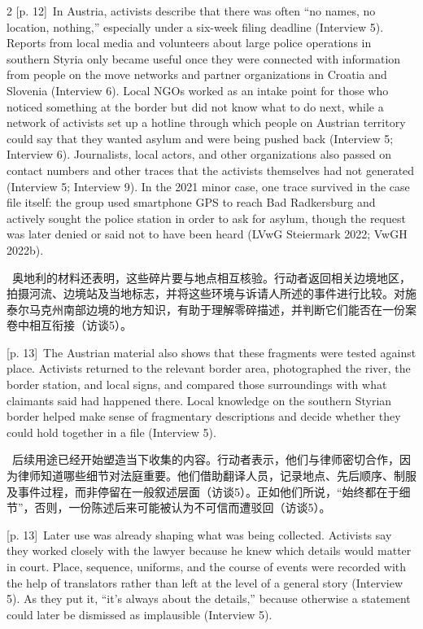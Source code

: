 \documentclass[10pt,a4paper]{article}
\begin{document}
\begin{paracol}{2}
{\scriptsize\color{gray} [p. 12]}\ In Austria, activists describe that there was often “no names, no location, nothing,” especially under a six-week filing deadline (Interview 5). Reports from local media and volunteers about large police operations in southern Styria only became useful once they were connected with information from people on the move networks and partner organizations in Croatia and Slovenia (Interview 6). Local NGOs worked as an intake point for those who noticed something at the border but did not know what to do next, while a network of activists set up a hotline through which people on Austrian territory could say that they wanted asylum and were being pushed back (Interview 5; Interview 6). Journalists, local actors, and other organizations also passed on contact numbers and other traces that the activists themselves had not generated (Interview 5; Interview 9). In the 2021 minor case, one trace survived in the case file itself: the group used smartphone GPS to reach Bad Radkersburg and actively sought the police station in order to ask for asylum, though the request was later denied or said not to have been heard (LVwG Steiermark 2022; VwGH 2022b).\par
\switchcolumn*
{\scriptsize\color{gray} [p. 13]}\ 奥地利的材料还表明，这些碎片要与地点相互核验。行动者返回相关边境地区，拍摄河流、边境站及当地标志，并将这些环境与诉请人所述的事件进行比较。对施泰尔马克州南部边境的地方知识，有助于理解零碎描述，并判断它们能否在一份案卷中相互衔接（访谈5）。\par
\switchcolumn
{\scriptsize\color{gray} [p. 13]}\ The Austrian material also shows that these fragments were tested against place. Activists returned to the relevant border area, photographed the river, the border station, and local signs, and compared those surroundings with what claimants said had happened there. Local knowledge on the southern Styrian border helped make sense of fragmentary descriptions and decide whether they could hold together in a file (Interview 5).\par
\switchcolumn*
{\scriptsize\color{gray} [p. 13]}\ 后续用途已经开始塑造当下收集的内容。行动者表示，他们与律师密切合作，因为律师知道哪些细节对法庭重要。他们借助翻译人员，记录地点、先后顺序、制服及事件过程，而非停留在一般叙述层面（访谈5）。正如他们所说，“始终都在于细节”，否则，一份陈述后来可能被认为不可信而遭驳回（访谈5）。\par
\switchcolumn
{\scriptsize\color{gray} [p. 13]}\ Later use was already shaping what was being collected. Activists say they worked closely with the lawyer because he knew which details would matter in court. Place, sequence, uniforms, and the course of events were recorded with the help of translators rather than left at the level of a general story (Interview 5). As they put it, “it’s always about the details,” because otherwise a statement could later be dismissed as implausible (Interview 5).\par

\end{paracol}
\end{document}
